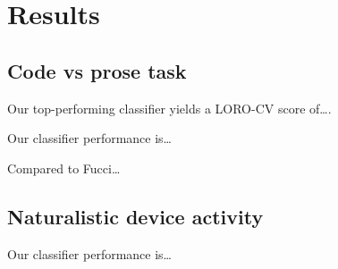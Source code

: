 \chapter{Results}

    \section{Code vs prose task}

        Our top-performing classifier yields a LORO-CV score of\ldots.

        Our classifier performance is\ldots

        Compared to Fucci\ldots

    \section{Naturalistic device activity}

        Our classifier performance is\ldots

